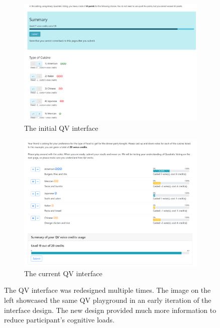 \begin{figure}
     \centering
     \begin{subfigure}[ht]{0.49\textwidth}
         \centering
         \includegraphics[width=\textwidth]{content/image/old_qv.png}
         \caption{The initial QV interface}
         \label{fig:old_qv_interface}
     \end{subfigure}
     \hfill
     \begin{subfigure}[ht]{0.49\textwidth}
         \centering
         \includegraphics[width=\textwidth]{content/image/new_qv.png}
         \caption{The current QV interface}
         \label{fig:new_qv_interface}
     \end{subfigure}
        \caption{The QV interface was redesigned multiple times. The image on the left showcased the same QV playground in an early iteration of the interface design. The new design provided much more information to reduce participant's cognitive loads.}
        \label{fig:appendix_qv_interface}
\end{figure}
